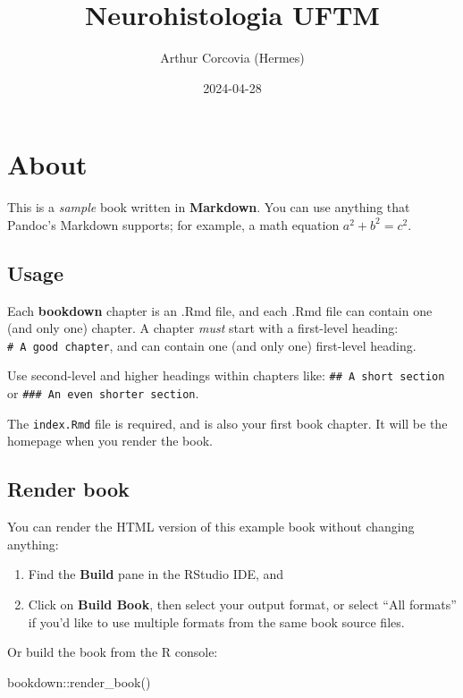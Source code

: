 \documentclass[
]{book}
\title{Neurohistologia UFTM}
\author{Arthur Corcovia (Hermes)}
\date{2024-04-28}
\newenvironment{Shaded}{\begin{snugshade}}{\end{snugshade}}
\newcommand{\FunctionTok}[1]{\textcolor[rgb]{0.00,0.00,0.00}{#1}}
\newcommand{\NormalTok}[1]{#1}
\newcommand{\SpecialCharTok}[1]{\textcolor[rgb]{0.00,0.00,0.00}{#1}}
\theoremstyle{definition}
\theoremstyle{definition}
\theoremstyle{definition}
\theoremstyle{definition}
\theoremstyle{remark}
\begin{document}
\maketitle

{
\setcounter{tocdepth}{1}
\tableofcontents
}
\hypertarget{about}{%
\chapter{About}\label{about}}

This is a \emph{sample} book written in \textbf{Markdown}. You can use anything that Pandoc's Markdown supports; for example, a math equation \(a^2 + b^2 = c^2\).

\hypertarget{usage}{%
\section{Usage}\label{usage}}

Each \textbf{bookdown} chapter is an .Rmd file, and each .Rmd file can contain one (and only one) chapter. A chapter \emph{must} start with a first-level heading: \texttt{\#\ A\ good\ chapter}, and can contain one (and only one) first-level heading.

Use second-level and higher headings within chapters like: \texttt{\#\#\ A\ short\ section} or \texttt{\#\#\#\ An\ even\ shorter\ section}.

The \texttt{index.Rmd} file is required, and is also your first book chapter. It will be the homepage when you render the book.

\hypertarget{render-book}{%
\section{Render book}\label{render-book}}

You can render the HTML version of this example book without changing anything:

\begin{enumerate}
\def\labelenumi{\arabic{enumi}.}
\item
  Find the \textbf{Build} pane in the RStudio IDE, and
\item
  Click on \textbf{Build Book}, then select your output format, or select ``All formats'' if you'd like to use multiple formats from the same book source files.
\end{enumerate}

Or build the book from the R console:

\begin{Shaded}
\begin{Highlighting}[]
\NormalTok{bookdown}\SpecialCharTok{::}\FunctionTok{render\_book}\NormalTok{()}
\end{Highlighting}
\end{Shaded}
\end{document}
